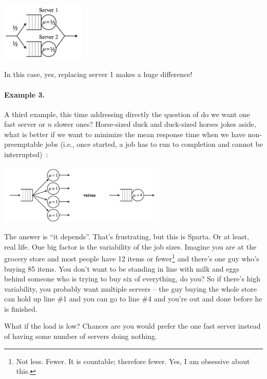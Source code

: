 \documentclass[a4paper]{report}
\begin{document}
\begin{center}
	\includegraphics[width=0.3\textwidth]{images/qt-example2-2.png}
\end{center}

In this case, yes, replacing server 1 makes a huge difference!

\paragraph{Example 3.} A third example, this time addressing directly the question of do we want one fast server or $n$ slower ones? Horse-sized duck and duck-sized horses jokes aside, what is better if we want to minimize the mean response time when we have non-preemptable jobs (i.e., once started, a job has to run to completion and cannot be interrupted)~\cite{pmd}:


\begin{center}
	\includegraphics[width=0.6\textwidth]{images/qt-example3.png}
\end{center}

The answer is ``it depends''. That's frustrating, but this is Sparta. Or at least, real life. One big factor is the variability of the job sizes. Imagine you are at the grocery store and most people have 12 items or fewer\footnote{Not less. Fewer. It is countable; therefore fewer. Yes, I am obsessive about this.} and there's one guy who's buying 85 items. You don't want to be standing in line with milk and eggs behind someone who is trying to buy six of everything, do you? So if there's high variability, you probably want multiple servers -- the guy buying the whole store can hold up line \#1 and you can go to line \#4 and you're out and done before he is finished.

What if the load is low? Chances are you would prefer the one fast server instead of having some number of servers doing nothing.
\end{document}
